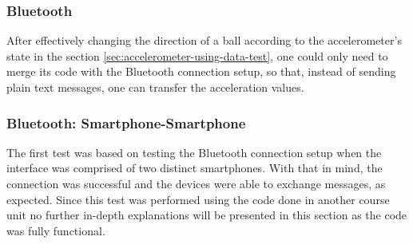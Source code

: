 \subsubsection{Bluetooth}%
\label{sec:bluetooth-test}
After effectively changing the direction of a ball according to the accelerometer's state in the section \ref{sec:accelerometer-using-data-test}, one could only need to merge its code with the Bluetooth connection setup, so that, instead of sending plain text messages, one can transfer the acceleration values.
%
\subsubsection{Bluetooth: Smartphone-Smartphone}%
\label{sec:bluetooth-phone-phone}
%
The first test was based on testing the Bluetooth connection setup when the interface was comprised of two distinct smartphones. With that in mind, the connection was successful and the devices were able to exchange messages, as expected. Since this test was performed using the code done in another course unit no further in-depth explanations will be presented in this section as the code was fully functional.
%
